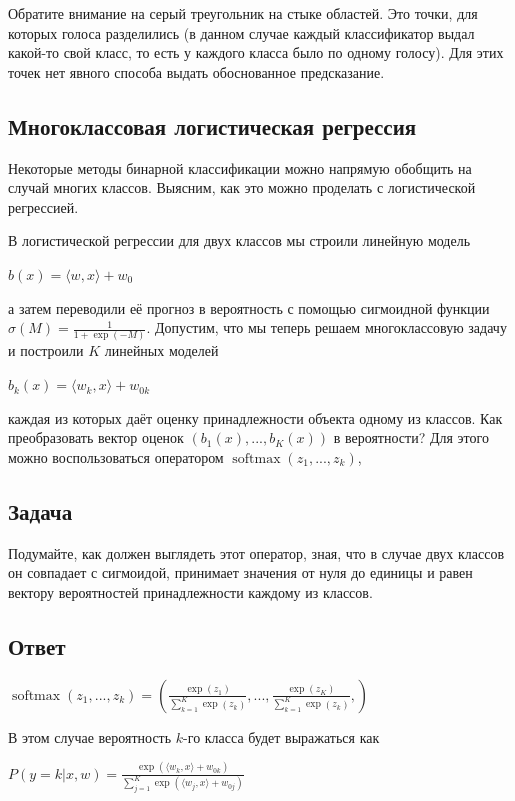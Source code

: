 \begin{itemize}
Обратите внимание на серый треугольник на стыке областей. Это точки, для которых голоса разделились (в данном случае каждый классификатор выдал какой-то свой класс, то есть у каждого класса было по одному голосу). Для этих точек нет явного способа выдать обоснованное предсказание.

\subsection{Многоклассовая логистическая регрессия}

Некоторые методы бинарной классификации можно напрямую обобщить на случай многих классов. Выясним, как это можно проделать с логистической регрессией.

В логистической регрессии для двух классов мы строили линейную модель

$b(x) = \langle w, x \rangle+w_0$

а затем переводили её прогноз в вероятность с помощью сигмоидной функции $\sigma(M) = \frac{1}{1+\operatorname{exp}(-M)}$. Допустим, что мы теперь решаем многоклассовую задачу и построили $K$ линейных моделей

$b_k(x) = \langle w_k, x \rangle+w_{0k}$

каждая из которых даёт оценку принадлежности объекта одному из классов. Как преобразовать вектор оценок $(b_1(x),...,b_K(x))$ в вероятности? Для этого можно воспользоваться оператором $\operatorname{softmax}(z_1,...,z_k)$,

\subsection*{Задача}

Подумайте, как должен выглядеть этот оператор, зная, что в случае двух классов он совпадает с сигмоидой, принимает значения от нуля до единицы и равен вектору вероятностей принадлежности каждому из классов.

\subsection*{Ответ}

$\operatorname{softmax}(z_1,...,z_k) = \left( \frac{\exp{(z_1)}}{\sum^K_{k=1}\exp{(z_k)}}, ..., \frac{\exp{(z_K)}}{\sum^K_{k=1}\exp{(z_k)}}, \right)$ \newline

В этом случае вероятность $k$-го класса будет выражаться как

$P(y=k|x,w) = \frac{\exp{(\langle w_k, x \rangle+w_{0k})}}{\sum^K_{j=1}\exp{(\langle w_j, x \rangle+w_{0j})}}$


\end{itemize}
